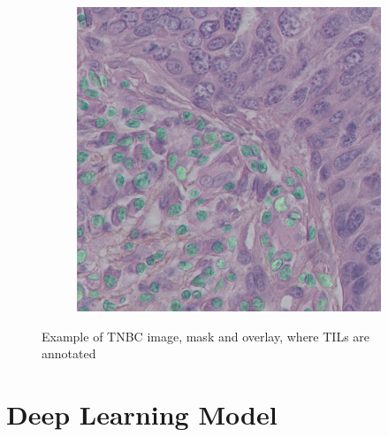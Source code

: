 \begin{figure}[H]
\begin{subfigure}[b]{0.32\textwidth}
    \label{fig:tcga-mask}
  \end{subfigure}%
  \hfill
  \begin{subfigure}[b]{0.32\textwidth}
    \centering
    \includegraphics[width=\linewidth]{assets/images/for_presentation/overlay_10_1.png}
    \label{fig:tcga-overlay}
  \end{subfigure}%
  \caption{Example of TNBC image, mask and overlay, where TILs are annotated \cite{TNBC-nuclei-seg-extended}}
  \label{fig:tcga-with-without}
\end{figure}

\section{Deep Learning Model}
\label{section:dl-model}

